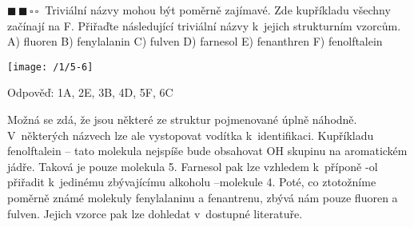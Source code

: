 \documentclass{book}
\newcommand{\dva}{$\blacksquare \, \blacksquare \, \square \, \square \; \; $}
\renewenvironment{quotation}{\par}{\par} %
\begin{document}
\hrulefill %
\begin{quotation}
\dva Triviální názvy mohou být poměrně zajímavé. Zde kupříkladu všechny začínají na F. Přiřaďte následující triviální názvy k~jejich strukturním vzorcům.\\
A) fluoren B) fenylalanin C) fulven D) farnesol E) fenanthren F) fenolftalein

\begin{center}
\texttt{[image: /1/5-6]}
\end{center}
\end{quotation} \dotfill \par 

Odpověď: 1A, 2E, 3B, 4D, 5F, 6C

Možná se zdá, že jsou některé ze struktur pojmenované úplně náhodně. V~některých názvech lze ale vystopovat vodítka k~identifikaci. Kupříkladu fenolftalein -- tato molekula nejspíše bude obsahovat OH skupinu na aromatickém jádře. Taková je pouze molekula 5. Farnesol pak lze vzhledem k~příponě -ol přiřadit k~jedinému zbývajícímu alkoholu --molekule 4. Poté, co ztotožníme poměrně známé molekuly fenylalaninu a fenantrenu, zbývá nám pouze fluoren a fulven. Jejich vzorce pak lze dohledat v~dostupné literatuře.
\end{document}
